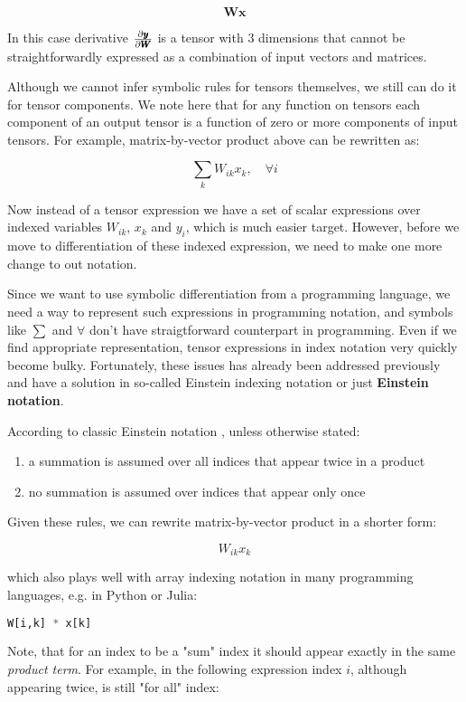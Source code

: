\documentclass[conference]{IEEEtran}
\begin{document}
$$\pmb{W}\pmb{x}$$

In this case derivative $\pdv{\pmb{y}}{\pmb{W}}$ is a tensor with 3
dimensions that cannot be straightforwardly expressed as a combination
of input vectors and matrices.

Although we cannot infer symbolic rules for tensors themselves, we
still can do it for tensor components. We note here that for any
function on tensors each component of an output tensor is a function
of zero or more components of input tensors. For example,
matrix-by-vector product above can be rewritten as:

$$\sum_kW_{ik}x_k ,\quad \forall i$$

Now instead of a tensor expression we have a set of scalar expressions
over indexed variables $W_{ik}$, $x_k$ and $y_i$, which is much easier
target.  However, before we move to differentiation of these indexed
expression, we need to make one more change to out notation.

Since we want to use symbolic differentiation from a programming
language, we need a way to represent such expressions in programming
notation, and symbols like $\sum$ and $\forall$ don't have
straigtforward counterpart in programming. Even if we find appropriate
representation, tensor expressions in index notation very quickly
become bulky. Fortunately, these issues has already been addressed
previously and have a solution in so-called Einstein indexing notation
or just \textbf{Einstein notation}.

According to classic Einstein notation \cite{dullemond2010}, unless
otherwise stated:


\begin{enumerate}
\item a summation is assumed over all indices that appear twice in a
  product
\item no summation is assumed over indices that appear only once
\end{enumerate}

Given these rules, we can rewrite matrix-by-vector product in a
shorter form:


$$W_{ik}x_k$$

which also plays well with array indexing notation in many programming
languages, e.g. in Python or Julia:

\begin{lstlisting}[language=Python]
  W[i,k] * x[k]
\end{lstlisting}

Note, that for an index to be a "sum" index it should appear exactly
in the same \textit{product term}. For example, in the following
expression index $i$, although appearing twice, is still "for all"
index:
\end{document}
